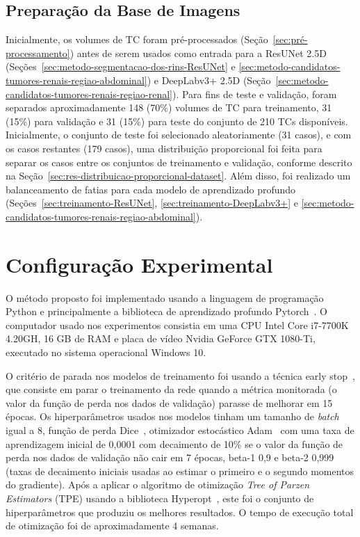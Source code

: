 \subsection{Preparação da Base de Imagens}
\label{sec:preparacao-conjunto-dados}

Inicialmente, os volumes de TC foram pré-processados (Seção~\ref{sec:pré-processamento}) antes de serem usados como entrada para a ResUNet 2.5D (Seções~\ref{sec:metodo-segmentacao-dos-rins-ResUNet} e \ref{sec:metodo-candidatos-tumores-renais-regiao-abdominal}) e DeepLabv3+ 2.5D (Seção~\ref{sec:metodo-candidatos-tumores-renais-regiao-renal}). Para fins de teste e validação, foram separados aproximadamente 148 (70\%) volumes de TC para treinamento, 31 (15\%) para validação e 31 (15\%) para teste do conjunto de 210 TCs disponíveis. Inicialmente, o conjunto de teste foi selecionado aleatoriamente (31 casos), e com os casos restantes (179 casos), uma distribuição proporcional foi feita para separar os casos entre os conjuntos de treinamento e validação, conforme descrito na Seção~\ref{sec:res-distribuicao-proporcional-dataset}. Além disso, foi realizado um balanceamento de fatias para cada modelo de aprendizado profundo (Seções~\ref{sec:treinamento-ResUNet}, \ref{sec:treinamento-DeepLabv3+} e \ref{sec:metodo-candidatos-tumores-renais-regiao-abdominal}).

\section{Configuração Experimental}
\label{sec:configuracao-experimental}

O método proposto foi implementado usando a linguagem de programação Python e principalmente a biblioteca de aprendizado profundo Pytorch~\cite{NEURIPS2019_9015}. O computador usado nos experimentos consistia em uma CPU Intel Core i7-7700K 4.20GH, 16 GB de RAM e placa de vídeo Nvidia GeForce GTX 1080-Ti, executado no sistema operacional Windows 10.

O critério de parada nos modelos de treinamento foi usando a técnica early stop~\cite{brownlee2018better}, que consiste em parar o treinamento da rede quando a métrica monitorada (o valor da função de perda nos dados de validação) parasse de melhorar em 15 épocas. Os hiperparâmetros usados nos modelos tinham um tamanho de \textit{batch} igual a 8, função de perda Dice~\cite{dice1945}, otimizador estocástico Adam~\cite{adam2014} com uma taxa de aprendizagem inicial de 0,0001 com decaimento de 10\% se o valor da função de perda nos dados de validação não cair em 7 épocas, beta-1 0,9 e beta-2 0,999 (taxas de decaimento iniciais usadas ao estimar o primeiro e o segundo momentos do gradiente). Após a aplicar o algoritmo de otimização \textit{Tree of Parzen Estimators} (TPE) usando a biblioteca Hyperopt~\cite{bergstra2013making}, este foi o conjunto de hiperparâmetros que produziu os melhores resultados. O tempo de execução total de otimização foi de aproximadamente 4 semanas.

